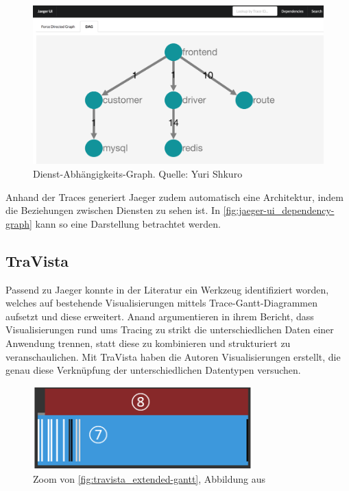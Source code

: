 \begin{figure}
\centering
\includegraphics[width=\linewidth]{img/03_methoden/medium_jaeger-ui_dependency-graph.png}
\caption{Dienst-Abhängigkeits-Graph. Quelle: Yuri Shkuro \cite{JaegerTakeOpenTracingForARide}}
\label{fig:jaeger-ui_dependency-graph}
\end{figure}

Anhand der Traces generiert Jaeger zudem automatisch eine Architektur, indem die Beziehungen zwischen Diensten zu sehen ist. In \autoref{fig:jaeger-ui_dependency-graph} kann so eine Darstellung betrachtet werden.

\subsection{TraVista}

Passend zu Jaeger konnte in der Literatur ein Werkzeug identifiziert worden, welches auf bestehende Visualisierungen mittels Trace-Gantt-Diagrammen aufsetzt und diese erweitert. Anand \etal \cite{TraVistaPaper} argumentieren in ihrem Bericht, dass Visualisierungen rund ums Tracing zu strikt die unterschiedlichen Daten einer Anwendung trennen, statt diese zu kombinieren und strukturiert zu veranschaulichen. Mit TraVista haben die Autoren Visualisierungen erstellt, die genau diese Verknüpfung der unterschiedlichen Datentypen versuchen.

\begin{figure}
\centering
\vspace{-1.5\baselineskip}
\includegraphics[width=\linewidth]{img/03_methoden/travista_extended-gantt_zoomed-in.png}
\caption{Zoom von \autoref{fig:travista_extended-gantt}, Abbildung aus \cite{TraVistaPaper}}
\label{fig:travista_extended-gantt_zoomed-in}
\end{figure}

